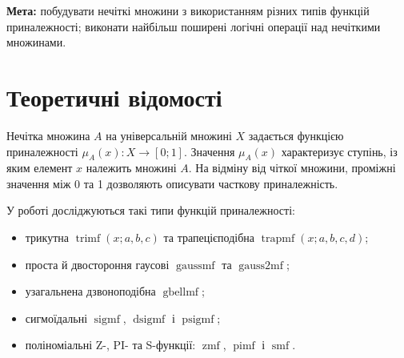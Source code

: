 \documentclass[12pt,a4paper]{article}
\begin{document}
\medskip

\noindent
\textbf{Мета:} побудувати нечіткі множини з використанням різних типів
функцій приналежності; виконати найбільш поширені логічні операції над
нечіткими множинами.

\section{Теоретичні відомості}

Нечітка множина $A$ на універсальній множині $X$ задається функцією
приналежності $\mu_A(x)\colon X\to[0;1]$. Значення $\mu_A(x)$ характеризує
ступінь, із яким елемент $x$ належить множині $A$. На відміну від чіткої
множини, проміжні значення між 0 та 1 дозволяють описувати часткову
приналежність.

У роботі досліджуються такі типи функцій приналежності:

\begin{itemize}[leftmargin=*,itemsep=0.25em]
  \item трикутна $\operatorname{trimf}(x; a,b,c)$ та трапецієподібна
    $\operatorname{trapmf}(x; a,b,c,d)$;
  \item проста й двостороння гаусові $\operatorname{gaussmf}$ та
    $\operatorname{gauss2mf}$;
  \item узагальнена дзвоноподібна $\operatorname{gbellmf}$;
  \item сигмоїдальні $\operatorname{sigmf}$, $\operatorname{dsigmf}$ і
    $\operatorname{psigmf}$;
  \item поліноміальні Z-, PI- та S-функції: $\operatorname{zmf}$,
    $\operatorname{pimf}$ і $\operatorname{smf}$.
\end{itemize}
\end{document}
